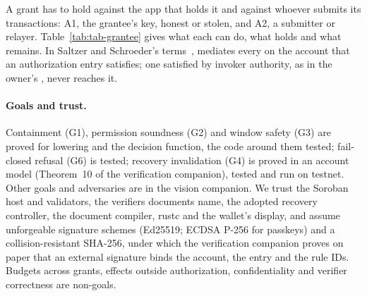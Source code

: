 A grant has to hold against the app that holds it and against whoever submits
its transactions: A1, the grantee's key, honest or stolen, and A2, a submitter
or relayer. Table~\ref{tab:tab-grantee} gives what each can do, what holds and
what remains. In Saltzer and Schroeder's terms~\cite{saltzer-schroeder},
 mediates every  on the account that
an authorization entry satisfies; one satisfied by invoker authority, as in the
owner's , never reaches it.


\paragraph{Goals and trust.} Containment (G1), permission soundness (G2) and
window safety (G3) are proved for lowering and the decision function, the code
around them tested; fail-closed refusal (G6) is tested; recovery invalidation
(G4) is proved in an account model (Theorem~10 of the verification companion),
tested and run on testnet. Other goals and adversaries are in the vision
companion. We trust the Soroban host and validators, the verifiers documents
name, the adopted recovery controller, the document compiler, rustc
and the wallet's display, and assume unforgeable signature schemes (Ed25519;
ECDSA P-256 for passkeys) and a collision-resistant SHA-256, under which the
verification companion proves on paper that an external signature binds the
account, the entry and the rule IDs. Budgets across grants, effects outside authorization,
confidentiality and verifier correctness are non-goals.
